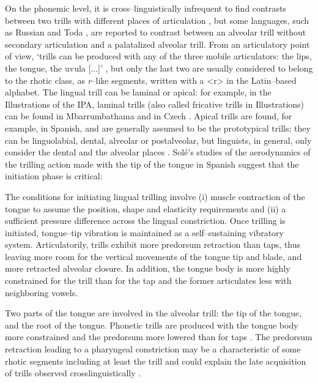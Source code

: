 On the phonemic level, it is cross–linguistically infrequent to find contrasts between two trills with different places of articulation \parencite{ladefogedLateralsTrills1977,maddiesonPatternsSounds1984}, but some languages, such as Russian \parencite{yanushevskayaRussian2015} and Toda \parencite{spajicTrillsToda1996}, are reported to contrast between an alveolar trill without secondary articulation and a palatalized alveolar trill. From an articulatory point of view, ‘trills can be produced with any of the three mobile articulators: the lips, the tongue, the uvula [...]’ \parencite[49]{ladefogedLateralsTrills1977}, but only the last two are usually considered to belong to the rhotic class, as \textit{r}–like segments, written with a <r> in the Latin–based alphabet. The lingual trill can be laminal or apical: for example, in the Illustrations of the IPA, laminal trills (also called fricative trills in Illustrations) can be found in Mbarrumbathama \parencite{verstraeteMbarrumbathamaLamalama2019} and in Czech \parencite{dankovicovaCzech1997, simackovaCzechSpokenBohemia2012}. Apical trills are found, for example, in Spanish, and are generally assumed to be the prototypical trills; they can be linguolabial, dental, alveolar or postalveolar, but linguists, in general, only consider the dental and the alveolar places \parencite{ladefogedLateralsTrills1977}. Solé’s studies \parencite*{solePhonologicalUniversalsTrilling1998,soleAerodynamicCharacteristicsTrills2002} of the aerodynamics of the trilling action made with the tip of the tongue in Spanish suggest that the initiation phase is critical:

\begin{displayquote}
The conditions for initiating lingual trilling involve (i) muscle contraction of the tongue to assume the position, shape and elasticity requirements and (ii) a sufficient pressure difference across the lingual constriction. Once trilling is initiated, tongue–tip vibration is maintained as a self–sustaining vibratory system. Articulatorily, trills exhibit more predorsum retraction than taps, thus leaving more room for the vertical movements of the tongue tip and blade, and more retracted alveolar closure. In addition, the tongue body is more highly constrained for the trill than for the tap and the former articulates less with neighboring vowels. \parencite[404]{solePhonologicalUniversalsTrilling1998}
\end{displayquote}

Two parts of the tongue are involved in the alveolar trill: the tip of the tongue, and the root of the tongue. Phonetic trills are produced with the tongue body more constrained and the predorsum more lowered than for taps \parencite{recasensStudyLightDAC1999}. The predorsum retraction leading to a pharyngeal constriction may be a characteristic of some rhotic segments including at least the trill \parencite{boyceAcquiringRhoticityLanguages2016} and could explain the late acquisition of trills observed crosslinguistically \parencite{mcleodChildrenConsonantAcquisition2018}.\\

